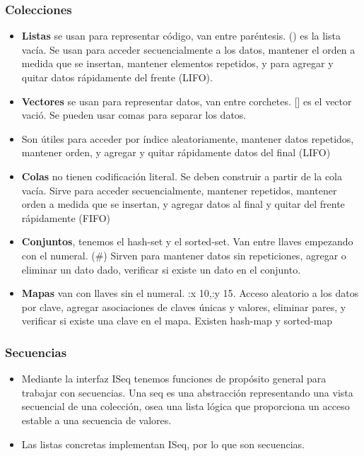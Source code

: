 \subsubsection*{Colecciones}
\begin{itemize}
\item \textbf{Listas} se usan para representar código, van entre paréntesis. () es la lista vacía. Se usan para acceder secuencialmente a los datos, mantener el orden a medida que se insertan, mantener elementos repetidos, y para agregar y quitar datos rápidamente del frente (LIFO).
\item \textbf{Vectores} se usan para representar datos, van entre corchetes. [] es el vector vació. Se pueden usar comas para separar los datos.
\item Son útiles para acceder por índice aleatoriamente, mantener datos repetidos, mantener orden, y agregar y quitar rápidamente datos del final (LIFO)
\item \textbf{Colas} no tienen codificación literal. Se deben construir a partir de la cola vacía. Sirve para acceder secuencialmente, mantener repetidos, mantener orden a medida que se insertan, y agregar datos al final y quitar del frente rápidamente (FIFO)
\item \textbf{Conjuntos}, tenemos el hash-set y el sorted-set. Van entre llaves empezando con el numeral. (\#{}) Sirven para mantener datos sin repeticiones, agregar o eliminar un dato dado, verificar si existe un dato en el conjunto.
\item \textbf{Mapas} van con llaves sin el numeral. {:x 10,:y 15}. Acceso aleatorio a los datos por clave, agregar asociaciones de claves únicas y valores, eliminar pares, y verificar si existe una clave en el mapa. Existen hash-map y sorted-map
\end{itemize}


\subsubsection*{Secuencias}
\begin{itemize}
\item Mediante la interfaz ISeq tenemos funciones de propósito general para trabajar con secuencias. Una seq es una abstracción representando una vista secuencial de una colección, osea una lista lógica que proporciona un acceso estable a una secuencia de valores. 
\item Las listas concretas implementan ISeq, por lo que son secuencias.
\end{itemize}



